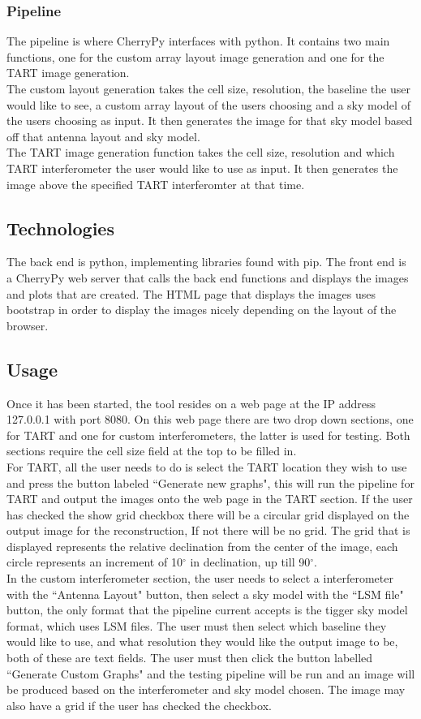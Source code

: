 \subsubsection{Pipeline}
The pipeline is where CherryPy interfaces with python. It contains two main functions, one for the custom array layout image generation and one for the TART image generation. \\The custom layout generation takes the cell size, resolution, the baseline the user would like to see, a custom array layout of the users choosing and a sky model of the users choosing as input. It then generates the image for that sky model based off that antenna layout and sky model.\\
The TART image generation function takes the cell size, resolution and which TART interferometer the user would like to use as input. It then generates the image above the specified TART interferomter at that time.

\subsection{Technologies}
The back end is python, implementing libraries found with pip. The front end is a CherryPy web server\cite{Cherrypy} that calls the back end functions and displays the images and plots that are created. The HTML page that displays the images uses bootstrap\cite{Bootstrap} in order to display the images nicely depending on the layout of the browser.

\subsection{Usage}
Once it has been started, the tool resides on a web page at the IP address 127.0.0.1 with port 8080. On this web page there are two drop down sections, one for TART and one for custom interferometers, the latter is used for testing. Both sections require the cell size field at the top to be filled in.
\\For TART, all the user needs to do is select the TART location they wish to use and press the button labeled ``Generate new graphs", this will run the pipeline for TART and output the images onto the web page in the TART section. If the user has checked the show grid checkbox there will be a circular grid displayed on the output image for the reconstruction, If not there will be no grid. The grid that is displayed represents the relative declination from the center of the image, each circle represents an increment of 10$^\circ$ in declination, up till 90$^\circ$. 
\\In the custom interferometer section, the user needs to select a interferometer with the ``Antenna Layout" button, then select a sky model with the ``LSM file" button, the only format that the pipeline current accepts is the tigger sky model format, which uses LSM files. The user must then select which baseline they would like to use, and what resolution they would like the output image to be, both of these are text fields. The user must then click the button labelled ``Generate Custom Graphs" and the testing pipeline will be run and an image will be produced based on the interferometer and sky model chosen. The image may also have a grid if the user has checked the checkbox.